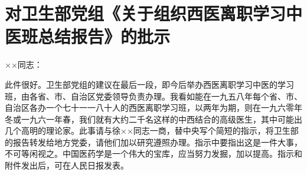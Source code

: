 \section[对卫生部党组《关于组织西医离职学习中医班总结报告》的批示（一九五八年十月十一日）]{对卫生部党组《关于组织西医离职学习中医班总结报告》的批示}


××同志：

此件很好。卫生部党组的建议在最后一段，即今后举办西医离职学习中医的学习班，由各省、市、自治区党委领导负责办理。我看如能在一九五八年每个省、市、自治区各办一个七十一一八十人的西医离职学习班，以两年为期，则在一九六零年冬或一九六一年春，我们就有大约二千名这样的中西结合的高级医生，其中可能出几个高明的理论家。此事请与徐××同志一商，替中央写个简短的指示，将卫生部的报告转发给地方党委，请他们加以研究遵照办理。指示中要指出这是一件大事，不可等闲视之。中国医药学是一个伟大的宝库，应当努力发掘，加以提高。指示和附件发出后，可在人民日报发表。


